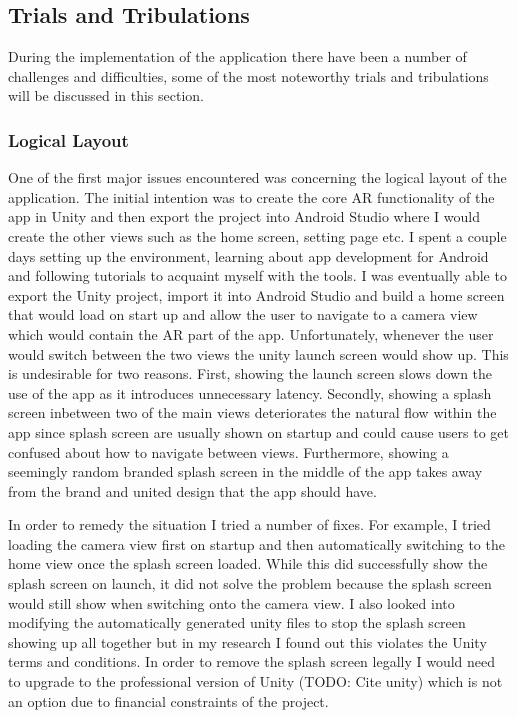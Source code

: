 \documentclass{l4proj}
\begin{document}
\subsection{Trials and Tribulations }
During the implementation of the application there have been a number of challenges and difficulties, some of the most noteworthy trials and tribulations will be discussed in this section. 

\subsubsection{Logical Layout}
One of the first major issues encountered was concerning the logical layout of the application. The initial intention was to create the core AR functionality of the app in Unity and then export the project into Android Studio where I would create the other views such as the home screen, setting page etc. I spent a couple days setting up the environment, learning about app development for Android and following tutorials to acquaint myself with the tools. I was eventually able to export the Unity project, import it into Android Studio and build a home screen that would load on start up and allow the user to navigate to a camera view which would contain the AR part of the app. Unfortunately, whenever the user would switch between the two views the unity launch screen would show up. This is undesirable for two reasons. First, showing the launch screen slows down the use of the app as it introduces unnecessary latency. Secondly, showing a splash screen inbetween two of the main views deteriorates the natural flow within the app since splash screen are usually shown on startup and could cause users to get confused about how to navigate between views. Furthermore, showing a seemingly random branded splash screen in the middle of the app takes away from the brand and united design that the app should have. 

In order to remedy the situation I tried a number of fixes. For example, I tried loading the camera view first on startup and then automatically switching to the home view once the splash screen loaded. While this did successfully show the splash screen on launch, it did not solve the problem because the splash screen would still show when switching onto the camera view. I also looked into modifying the automatically generated unity files to stop the splash screen showing up all together but in my research I found out this violates the Unity terms and conditions. In order to remove the splash screen legally I would need to upgrade to the professional version of Unity (TODO: Cite unity) which is not an option due to financial constraints of the project.
\end{document}
